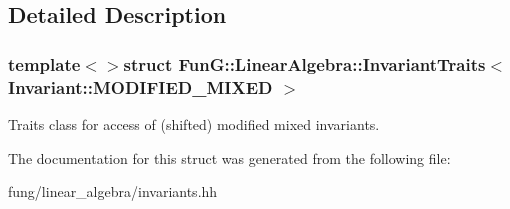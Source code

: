 \subsection{Detailed Description}
\subsubsection*{template$<$$>$struct Fun\-G\-::\-Linear\-Algebra\-::\-Invariant\-Traits$<$ Invariant\-::\-M\-O\-D\-I\-F\-I\-E\-D\-\_\-\-M\-I\-X\-E\-D $>$}

Traits class for access of (shifted) modified mixed invariants. 

The documentation for this struct was generated from the following file\-:\begin{DoxyCompactItemize}
\item 
fung/linear\-\_\-algebra/invariants.\-hh\end{DoxyCompactItemize}
